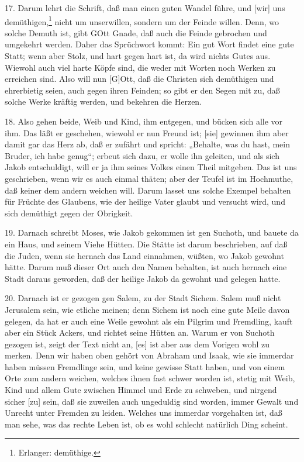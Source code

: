 17. Darum lehrt die Schrift, daß man einen guten Wandel führe, und [wir] uns demüthigen,\footnote{Erlanger: demüthige.} nicht um unserwillen, sondern um der Feinde willen. Denn, wo solche Demuth ist, gibt GOtt Gnade, daß auch die Feinde gebrochen und umgekehrt werden. Daher das Sprüchwort kommt: Ein gut Wort findet eine gute Statt; wenn aber Stolz, und hart gegen hart ist, da wird nichts Gutes aus. Wiewohl auch viel harte Köpfe sind, die weder mit Worten noch Werken zu erreichen sind. Also will nun [G]Ott, daß die Christen sich demüthigen und ehrerbietig seien, auch gegen ihren Feinden; so gibt er den Segen mit zu, daß solche Werke kräftig werden, und bekehren die Herzen.

18. Also gehen beide, Weib und Kind, ihm entgegen, und bücken sich alle vor ihm. Das läßt er geschehen, wiewohl er nun Freund ist; [sie] gewinnen ihm aber damit gar das Herz ab, daß er zufährt und spricht: „Behalte, was du hast, mein Bruder, ich habe genug“; erbeut sich dazu, er wolle ihn geleiten, und als sich Jakob entschuldigt, will er ja ihm seines Volkes einen Theil mitgeben. Das ist uns geschrieben, wenn wir es auch einmal thäten; aber der Teufel ist im Hochmuthe, daß keiner dem andern weichen will. Darum lasset uns solche Exempel behalten für Früchte des Glaubens, wie der heilige Vater glaubt und versucht wird, und sich demüthigt gegen der Obrigkeit.

19. Darnach schreibt Moses, wie Jakob gekommen ist gen Suchoth, und bauete da ein Haus, und seinem Viehe Hütten. Die Stätte ist darum beschrieben, auf daß die Juden, wenn sie hernach das Land einnahmen, wüßten, wo Jakob gewohnt hätte. Darum muß dieser Ort auch den Namen behalten, ist auch hernach eine Stadt daraus geworden, daß der heilige Jakob da gewohnt und gelegen hatte.

20. Darnach ist er gezogen gen Salem, zu der Stadt Sichem. Salem muß nicht Jerusalem sein, wie etliche meinen; denn Sichem ist noch eine gute Meile davon gelegen, da hat er auch eine Weile gewohnt als ein Pilgrim und Fremdling, kauft aber ein Stück Ackers, und richtet seine Hütten an. Warum er von Suchoth gezogen ist, zeigt der Text nicht an, [es] ist aber
aus dem Vorigen wohl zu merken. Denn wir haben oben gehört von Abraham und Isaak, wie sie immerdar haben müssen Fremdlinge sein, und keine gewisse Statt haben, und von einem Orte zum andern weichen, welches ihnen fast schwer worden ist, stetig mit Weib, Kind und allem Gute zwischen Himmel und Erde zu schweben, und nirgend sicher [zu] sein, daß sie zuweilen auch ungeduldig sind worden, immer Gewalt und Unrecht unter Fremden zu leiden. Welches uns immerdar vorgehalten ist, daß man sehe, was das rechte Leben ist, ob es wohl schlecht natürlich Ding scheint.


